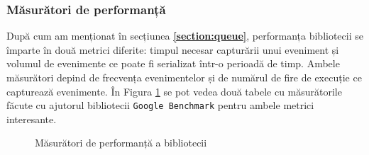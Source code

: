 \subsubsection{Măsurători de performanță}\label{library-performance}

După cum am menționat în secțiunea \textbf{\ref{section:queue}},
performanța bibliotecii se împarte în două metrici diferite: timpul
necesar capturării unui eveniment și volumul de evenimente ce poate fi
serializat într-o perioadă de timp. Ambele măsurători depind de
frecvența evenimentelor și de numărul de fire de execuție ce capturează
evenimente. În Figura \ref{fig:lib-perf} se pot vedea două tabele cu
măsurătorile făcute cu ajutorul bibliotecii \lstinline{Google Benchmark}
\cite{GoogleBenchmark} pentru ambele metrici interesante.

\begin{figure}[ht]
\centering
{}
\caption{Măsurători de performanță a bibliotecii}
\label{fig:lib-perf}
\end{figure}

